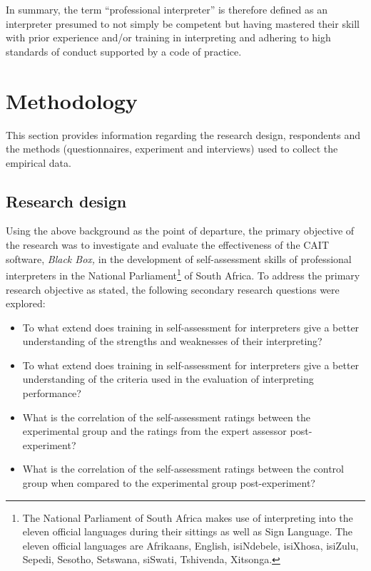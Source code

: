 \documentclass[output=paper]{langsci/langscibook}
\begin{document}
In summary, the term “professional interpreter” is therefore defined as an interpreter presumed to not simply be competent but having mastered their skill with prior experience and/or training in interpreting and adhering to high standards of conduct supported by a code of practice. 

\section{Methodology}
This section provides information regarding the research design, respondents and the methods (questionnaires, experiment and interviews) used to collect the empirical data. 

\subsection{Research design} 
Using the above background as the point of departure, the primary objective of the research was to investigate and evaluate the effectiveness of the \textsc{CAIT} software, \textit{Black Box,} in the development of self-assessment skills of professional interpreters in the National Parliament\footnote{The National Parliament of South Africa makes use of interpreting into the eleven official languages during their sittings as well as Sign Language. The eleven official languages are Afrikaans, English, isiNdebele, isiXhosa, isiZulu, Sepedi, Sesotho, Setswana, siSwati, Tshivenda, Xitsonga.}  of South Africa. To address the primary research objective as stated, the following secondary research questions were explored:

\begin{itemize}
\item To what extend does training in self-assessment for interpreters give a better understanding of the strengths and weaknesses of their interpreting?
\item To what extend does training in self-assessment for interpreters give a better understanding of the criteria used in the evaluation of interpreting performance?
\item What is the correlation of the self-assessment ratings between the experimental group and the ratings from the expert assessor post-experiment?
\item What is the correlation of the self-assessment ratings between the control group when compared to the experimental group post-experiment?
\end{itemize}
\end{document}
